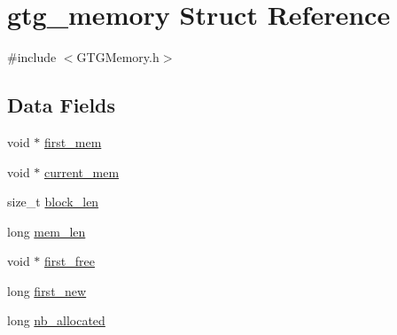 \hypertarget{structgtg__memory}{\section{gtg\-\_\-memory Struct Reference}
\label{structgtg__memory}
}


{\ttfamily \#include $<$G\-T\-G\-Memory.\-h$>$}

\subsection*{Data Fields}
\begin{DoxyCompactItemize}
\item 
void $\ast$ \hyperlink{structgtg__memory_a6dbfd29d58f156123a0631d528624d2d}{first\-\_\-mem}
\item 
void $\ast$ \hyperlink{structgtg__memory_a148a3e38cc32c18151302879bea08e0e}{current\-\_\-mem}
\item 
size\-\_\-t \hyperlink{structgtg__memory_a9719aa0ebb5be68ca02abb7fb2c8567e}{block\-\_\-len}
\item 
long \hyperlink{structgtg__memory_a6cd255b42292aec9dcd63cc8acba7798}{mem\-\_\-len}
\item 
void $\ast$ \hyperlink{structgtg__memory_adf206b4bc257b80a0b4491d1919198e8}{first\-\_\-free}
\item 
long \hyperlink{structgtg__memory_ac3764bd2efdc4775bf3c4ca51ebc6469}{first\-\_\-new}
\item 
long \hyperlink{structgtg__memory_a0e8dbe52c899485e23a29fca18203a4f}{nb\-\_\-allocated}
\end{DoxyCompactItemize}



